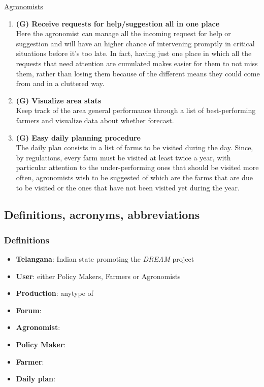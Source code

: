 \documentclass[table, 12pt]{article}
\begin{document}
\underline{Agronomists}
\begin{enumerate}
    \item \textbf{(G) Receive requests for help/suggestion all in one place}\\
    Here the agronomist can manage all the incoming request for help or suggestion and will have an higher chance of intervening promptly in critical situations before it's too late. In fact, having just one place in which all the requests that need attention are cumulated makes easier for them to not miss them, rather than losing them because of the different means they could come from and in a cluttered way.
    \item \textbf{(G) Visualize area stats}\\
    Keep track of the area general performance through a list of best-performing farmers and visualize data about whether forecast.
    \item \textbf{(G) Easy daily planning procedure}\\
    The daily plan consists in a list of farms to be visited during the day.
    Since, by regulations, every farm must be visited at least twice a year, with particular attention to the under-performing ones that should be visited more often, agronomists wish to be suggested of which are the farms that are due to be visited or the ones that have not been visited yet during the year.
\end{enumerate}

\subsection{Definitions, acronyms, abbreviations}
\subsubsection*{Definitions}
\begin{itemize}
    \item \textbf{Telangana}: Indian state promoting the \emph{DREAM} project
    \item \textbf{User}: either Policy Makers, Farmers or Agronomists
    \item \textbf{Production}: anytype of 
    \item \textbf{Forum}:
    \item \textbf{Agronomist}:
    \item \textbf{Policy Maker}:
    \item \textbf{Farmer}:
    \item \textbf{Daily plan}:
\end{itemize}
\end{document}
